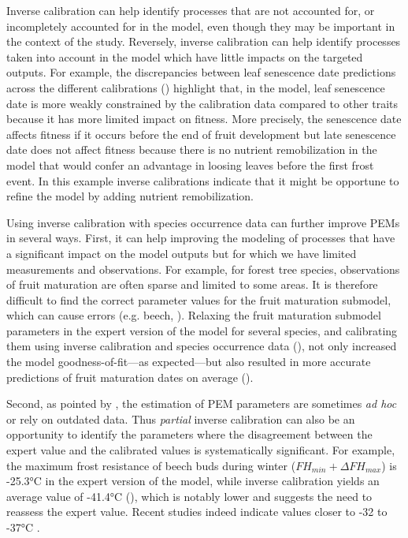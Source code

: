 \documentclass[letterpaper,8pt]{extarticle}  %
\begin{document}
\begin{doublespacing}
\begin{linenumbers}
Inverse calibration can help identify processes that are not accounted for, or incompletely accounted for in the model, even though they may be important in the context of the study.  Reversely, inverse calibration can help identify processes taken into account in the model which have little impacts on the targeted outputs. For example, the discrepancies between leaf senescence date predictions across the different calibrations () highlight that, in the model, leaf senescence date is more weakly constrained by the calibration data compared to other traits because it has more limited impact on fitness. More precisely, the senescence date affects fitness if it occurs before the end of fruit development but late senescence date does not affect fitness because there is no nutrient remobilization in the model that would confer an advantage in loosing leaves before the first frost event. In this example inverse calibrations indicate that it might be opportune to refine the model by adding nutrient remobilization.

Using inverse calibration with species occurrence data can further improve PEMs in several ways. First, it can help improving the modeling of processes that have a significant impact on the model outputs but for which we have limited measurements and observations. For example, for forest tree species, observations of fruit maturation are often sparse and limited to some areas. It is therefore difficult to find the correct parameter values for the fruit maturation submodel, which can cause errors (e.g. beech, ). Relaxing the fruit maturation submodel parameters in the expert version of the model for several species, and calibrating them using inverse calibration and species occurrence data (), not only increased the model goodness-of-fit---as expected---but also resulted in more accurate predictions of fruit maturation dates on average ().

Second, as pointed by \cite{Harrison2021}, the estimation of PEM parameters are sometimes \emph{ad hoc} or rely on outdated data. Thus \emph{partial} inverse calibration can also be an opportunity to identify the parameters where the disagreement between the expert value and the calibrated values is systematically significant. For example, the maximum frost resistance of beech buds during winter ($FH_{min}+\Delta FH_{max}$) is -25.3°C in the expert version of the model, while inverse calibration yields an average value of -41.4°C (), which is notably lower and suggests the need to reassess the expert value. Recent studies indeed indicate values closer to -32 to -37°C \citep{Delaporte2015, Kreyling2014, Lenz2016, Baffoin2021, CharraVaskou2012}.
 

\end{linenumbers}
\end{doublespacing}
\end{document}
